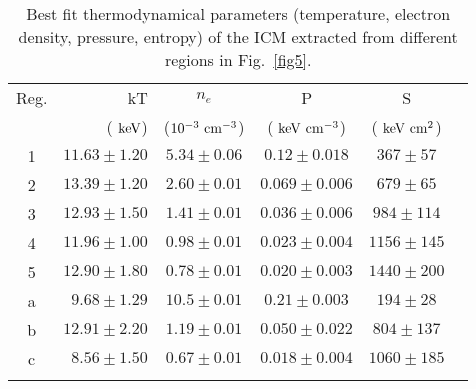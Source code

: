 \documentclass[useASM,usenatbib]{mn2e}
\newcommand\kev{{\rm~keV}}
\begin{document}
\begin{table}
  \caption{Best fit thermodynamical parameters (temperature, electron density,
    pressure, entropy)
    of the ICM extracted from different regions in Fig.~\ref{fig5}. }
\begin{center}
\begin{tabular}{crcccc}
\hline
\hline
Reg.  & kT     &  $n_{e}$                 & P                    &  S                \\
      & ($\kev$)  &($10^{-3}\rm~cm^{-3}$)    & ($\kev\rm~cm^{-3}$)   & ($\kev\rm~cm^{2}$)  \\
\hline
1     & $11.63\pm1.20$ 		& $5.34\pm0.06$ &  $0.12\pm0.018 $  & $367\pm57$ \\
2     & $13.39\pm1.20$ 		& $2.60\pm0.01$ &  $0.069\pm0.006$  & $679\pm65$ \\
3     & $12.93\pm1.50$ 		& $1.41\pm0.01$ &  $0.036\pm0.006$  & $984\pm114$ \\
4     & $11.96\pm1.00$ 		& $0.98\pm0.01$ &  $0.023\pm0.004$  & $1156\pm145$ \\
5     & $12.90\pm1.80$ 		& $0.78\pm0.01$ &  $0.020\pm0.003$  & $1440\pm200$ \\

a     & $9.68\pm1.29$  		& $10.5\pm0.01$   &  $0.21\pm0.003 $  & $194\pm28$ \\
b     & $12.91\pm2.20$ 		& $1.19\pm0.01$  &  $0.050\pm0.022$  & $804\pm137$ \\
c     & $8.56\pm1.50$  		& $0.67\pm0.01$  &  $0.018\pm0.004$  & $1060\pm185$ \\
\hline
\hline
\label{fit_thermo}
\end{tabular}
\end{center}
\end{table}
\end{document}
